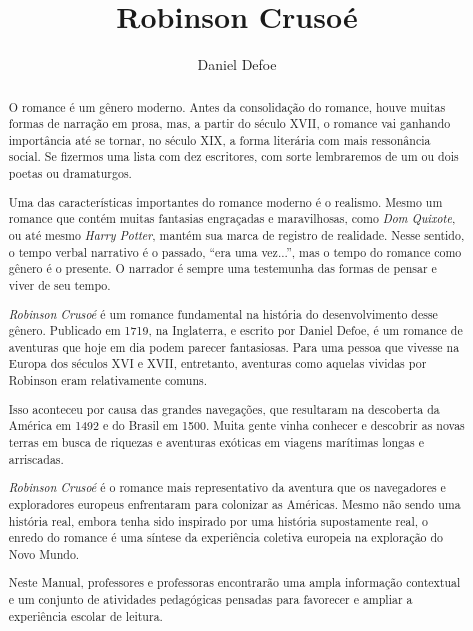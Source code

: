 \documentclass[12pt]{extarticle}
\begin{document}
\newcommand{\AutorLivro}{Daniel Defoe}
\newcommand{\TituloLivro}{Robinson Crusoé}
\newcommand{\Tema}{Ficção, mistério e fantasia}
\newcommand{\Genero}{Romance}
\newcommand{\imagemCapa}{./images/PNLD0013-01.png}
\newcommand{\issnppub}{978-65-994304-3-5}
\newcommand{\issnepub}{978-65-994304-2-8}
\newcommand{\colaborador}{{Iuri Pereira}}


\title{\TituloLivro}
\author{\AutorLivro}
\def\authornotes{\colaborador}

\date{}
\maketitle

\baselineskip\par


\begin{abstract}

O romance é um gênero moderno. Antes da consolidação do romance, houve
muitas formas de narração em prosa, mas, a partir do século XVII, o
romance vai ganhando importância até se tornar, no século XIX, a forma
literária com mais ressonância social. Se fizermos uma lista com dez
escritores, com sorte lembraremos de um ou dois poetas ou dramaturgos.

Uma das características importantes do romance moderno é o realismo.
Mesmo um romance que contém muitas fantasias engraçadas e maravilhosas,
como \emph{Dom Quixote}, ou até mesmo \emph{Harry Potter}, mantém sua
marca de registro de realidade. Nesse sentido, o tempo verbal narrativo
é o passado, ``era uma vez...'', mas o tempo do romance como gênero é o
presente. O narrador é sempre uma testemunha das formas de pensar e
viver de seu tempo.

\emph{Robinson Crusoé} é um romance fundamental na história do
desenvolvimento desse gênero. Publicado em 1719, na Inglaterra, e
escrito por Daniel Defoe, é um romance de aventuras que hoje em dia
podem parecer fantasiosas. Para uma pessoa que vivesse na Europa dos
séculos XVI e XVII, entretanto, aventuras como aquelas vividas por
Robinson eram relativamente comuns.

Isso aconteceu por causa das grandes navegações, que resultaram na
descoberta da América em 1492 e do Brasil em 1500. Muita gente vinha
conhecer e descobrir as novas terras em busca de riquezas e aventuras
exóticas em viagens marítimas longas e arriscadas.

\emph{Robinson Crusoé} é o romance mais representativo da aventura que
os navegadores e exploradores europeus enfrentaram para colonizar as
Américas. Mesmo não sendo uma história real, embora tenha sido inspirado
por uma história supostamente real, o enredo do romance é uma síntese da
experiência coletiva europeia na exploração do Novo Mundo.

Neste Manual, professores e professoras encontrarão uma ampla informação
contextual e um conjunto de atividades pedagógicas pensadas para
favorecer e ampliar a experiência escolar de leitura.
\end{abstract}
\end{document}
